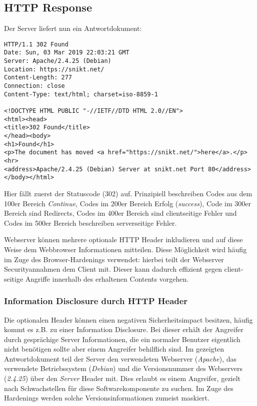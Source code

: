 \subsection{HTTP Response}

Der Server liefert nun ein Antwortdokument:

\begin{verbatim}
HTTP/1.1 302 Found
Date: Sun, 03 Mar 2019 22:03:21 GMT
Server: Apache/2.4.25 (Debian)
Location: https://snikt.net/
Content-Length: 277
Connection: close
Content-Type: text/html; charset=iso-8859-1

<!DOCTYPE HTML PUBLIC "-//IETF//DTD HTML 2.0//EN">
<html><head>
<title>302 Found</title>
</head><body>
<h1>Found</h1>
<p>The document has moved <a href="https://snikt.net/">here</a>.</p>
<hr>
<address>Apache/2.4.25 (Debian) Server at snikt.net Port 80</address>
</body></html>
\end{verbatim}

Hier fällt zuerst der Statuscode (302) auf. Prinzipiell beschreiben Codes aus dem 100er Bereich \textit{Continue}, Codes im 200er Bereich Erfolg (\textit{success}), Code im 300er Bereich sind Redirects, Codes im 400er Bereich sind clientseitige Fehler und Codes im 500er Bereich beschreiben serverseitige Fehler.

Webserver können mehrere optionale HTTP Header inkludieren und auf diese Weise dem Webbrowser Informationen mitteilen. Diese Möglichkeit wird häufig im Zuge des Browser-Hardenings verwendet: hierbei teilt der Webserver Securityannahmen dem Client mit. Dieser kann dadurch effizient gegen client-seitige Angriffe innerhalb des erhaltenen Contents vorgehen.

\subsubsection{Information Disclosure durch HTTP Header}

Die optionalen Header können einen negativen Sicherheitsimpact besitzen, häufig kommt es z.B. zu einer Information Disclosure. Bei dieser erhält der Angreifer durch gesprächige Server Informationen, die ein normaler Benutzer eigentlich nicht benötigen sollte aber einem Angreifer behilflich sind. Im gezeigten Antwortdokument teil der Server den verwendeten Webserver (\textit{Apache}), das verwendete Betriebssystem (\textit{Debian}) und die Versionsnummer des Webservers (\textit{2.4.25}) über den \textit{Server} Header mit. Dies erlaubt es einem Angreifer, gezielt nach Schwachstellen für diese Softwarekomponente zu suchen. Im Zuge des Hardenings werden solche Versionsinformationen zumeist maskiert.

